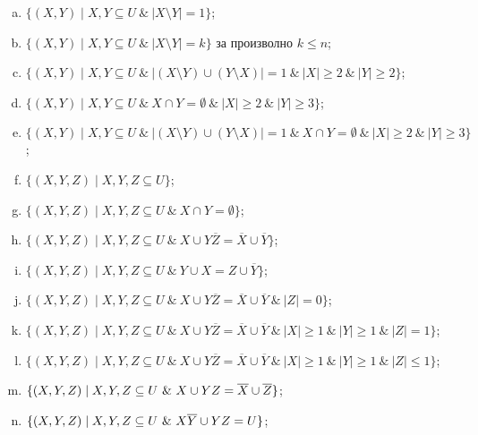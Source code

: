 \begin{problem}
\begin{enumerate}[a)]
  \item
    $\{(X,Y) \mid X,Y\subseteq U\ \&\ |X\setminus Y| = 1\}$;
  \item
    $\{(X,Y) \mid X,Y\subseteq U\ \&\ |X\setminus Y| = k\}$ за произволно $k \leq n$;
  \item
    $\{(X,Y) \mid X,Y\subseteq U\ \&\ |(X\setminus Y)\cup(Y\setminus X)| = 1\ \&\ |X|\geq 2\ \&\ |Y|\geq 2\}$;
  \item
    $\{(X,Y) \mid X,Y\subseteq U\ \&\ X\cap Y = \emptyset\ \&\ |X|\geq 2\ \&\ |Y|\geq 3\}$;
  \item
    $\{(X,Y) \mid X,Y\subseteq U\ \&\ |(X\setminus Y)\cup(Y\setminus X)| = 1\ \&\ X\cap Y = \emptyset\ \&\ |X|\geq 2\ \&\ |Y|\geq 3\}$;
  \item
    $\{(X,Y,Z) \mid X,Y,Z\subseteq U\}$;
  \item
    $\{(X,Y,Z) \mid X,Y,Z\subseteq U\ \&\ X \cap Y = \emptyset\}$;
  \item
    $\{(X,Y,Z) \mid X,Y,Z\subseteq U\ \&\ X\cup Y\overline{Z} = \overline{X}\cup\overline{Y}\}$;
  \item
    $\{(X,Y,Z) \mid X,Y,Z\subseteq U\ \&\ Y\cup X = Z\cup\overline{Y}\}$;
  \item
    $\{(X,Y,Z) \mid X,Y,Z\subseteq U\ \&\ X\cup Y\overline{Z} = \overline{X}\cup\overline{Y}\ \&\ |Z| = 0\}$;
  \item
    $\{(X,Y,Z) \mid X,Y,Z \subseteq U\ \&\ X\cup Y\overline{Z} = \overline{X}\cup\overline{Y}\ \&\ |X|\geq 1\ \&\ |Y|\geq 1\ \&\ |Z| = 1\}$;
  \item
    $\{(X,Y,Z) \mid X,Y,Z\subseteq U\ \&\ X\cup Y\overline{Z} = \overline{X}\cup\overline{Y}\ \&\ |X|\geq 1\ \&\ |Y|\geq 1\ \&\ |Z|\leq 1\}$;
  \item
    $\{(X,Y,Z) \mid X,Y,Z\subseteq U\ \&\ X \cup YZ = \ov{X} \cup \ov{Z}\}$;
  \item
    $\{(X,Y,Z) \mid X,Y,Z\subseteq U\ \&\ X\ov{Y} \cup YZ = U\}$;
  \end{enumerate}
\end{problem}
